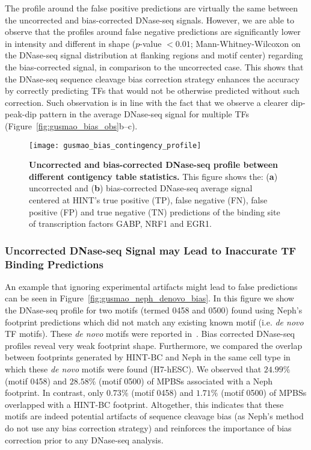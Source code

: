The profile around the false positive predictions are virtually the same between the uncorrected and bias-corrected DNase-seq signals. However, we are able to observe that the profiles around false negative predictions are significantly lower in intensity and different in shape ($p$-value $< 0.01$; Mann-Whitney-Wilcoxon on the DNase-seq signal distribution at flanking regions and motif center) regarding the bias-corrected signal, in comparison to the uncorrected case. This shows that the DNase-seq sequence cleavage bias correction strategy enhances the accuracy by correctly predicting TFs that would not be otherwise predicted without such correction. Such observation is in line with the fact that we observe a clearer dip-peak-dip pattern in the average DNase-seq signal for multiple TFs (Figure~\ref{fig:gusmao_bias_obs}b--c).

\begin{figure}[h!]
\centering
\texttt{[image: gusmao\_bias\_contingency\_profile]}
\caption[Uncorrected and bias-corrected DNase-seq profile between different contigency table statistics]{\textbf{Uncorrected and bias-corrected DNase-seq profile between different contigency table statistics.} This figure shows the: (\textbf{a}) uncorrected and (\textbf{b}) bias-corrected DNase-seq average signal centered at HINT's true positive (TP), false negative (FN), false positive (FP) and true negative (TN) predictions of the binding site of transcription factors GABP, NRF1 and EGR1.}
\label{fig:gusmao_bias_contingency_profile}
\end{figure}

\subsubsection{Uncorrected DNase-seq Signal may Lead to Inaccurate TF Binding Predictions}

An example that ignoring experimental artifacts might lead to false predictions can be seen in Figure~\ref{fig:gusmao_neph_denovo_bias}. In this figure we show the DNase-seq profile for two motifs (termed 0458 and 0500) found using Neph's footprint predictions which did not match any existing known motif (i.e. \emph{de novo} TF motifs). These \emph{de novo} motifs were reported in~\cite{neph2012a}. Bias corrected DNase-seq profiles reveal very weak footprint shape. Furthermore, we compared the overlap between footprints generated by HINT-BC and Neph in the same cell type in which these \emph{de novo} motifs were found (H7-hESC). We observed that $24.99\%$ (motif 0458) and $28.58\%$ (motif 0500) of MPBSs associated with a Neph footprint. In contrast, only $0.73\%$ (motif 0458) and $1.71\%$ (motif 0500) of MPBSs overlapped with a HINT-BC footprint. Altogether, this indicates that these motifs are indeed potential artifacts of sequence cleavage bias (as Neph's method do not use any bias correction strategy) and reinforces the importance of bias correction prior to any DNase-seq analysis.

